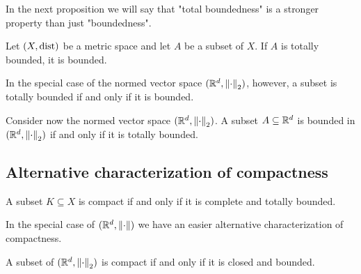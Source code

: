 In the next proposition we will say that "total boundedness" is a stronger property than just "boundedness".

\begin{proposition}
    Let $(X, \text{dist})$ be a metric space and let $A$ be a subset of $X$. If $A$ is totally bounded, it is bounded.
\end{proposition}

In the special case of the normed vector space $(\mathbb{R}^d, \norm{\cdot}_2)$, however, a subset is totally bounded if and only
if it is bounded.

\begin{proposition}
    Consider now the normed vector space $(\mathbb{R}^d, \norm{\cdot}_2)$. A subset $A \subseteq \mathbb{R}^d$ is bounded in $(\mathbb{R}^d, \norm{\cdot}_2)$
    if and only if it is totally bounded.
\end{proposition}

\subsection{Alternative characterization of compactness}
\begin{theorem}
    A subset $K \subseteq X$ is compact if and only if it is complete and totally bounded.
\end{theorem}

In the special case of $(\mathbb{R}^d, \norm{\cdot})$ we have an easier alternative characterization of compactness.
\begin{theorem}
    \label{thm:heine-borel}
    A subset of $(\mathbb{R}^d, \norm{\cdot}_2)$ is compact if and only if it is closed and bounded.
\end{theorem}
